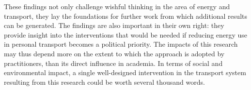 \documentclass[a4paper, 11pt, twoside]{Thesis}
\begin{document}
These findings not only challenge wishful thinking in the area of energy and
transport, they lay the
foundations for further work from which additional results can be
generated. The findings are also important in their own right: they
provide insight into the interventions that would be needed if reducing energy
use in personal transport
becomes a political priority. The impacts of this research may thus
depend more on the extent to which the approach is adopted by practitioners,
than its direct influence in
academia. In terms of social and environmental impact, a single well-designed
intervention in the transport system resulting from this research could be worth
several thousand words.

%
 


\appendix 

\backmatter

\label{Bibliography}

\fancyhead[RE,LO]{\thepage}
\fancyfoot{}

  
  




\printindex
\label{index}
{}
\end{document}
